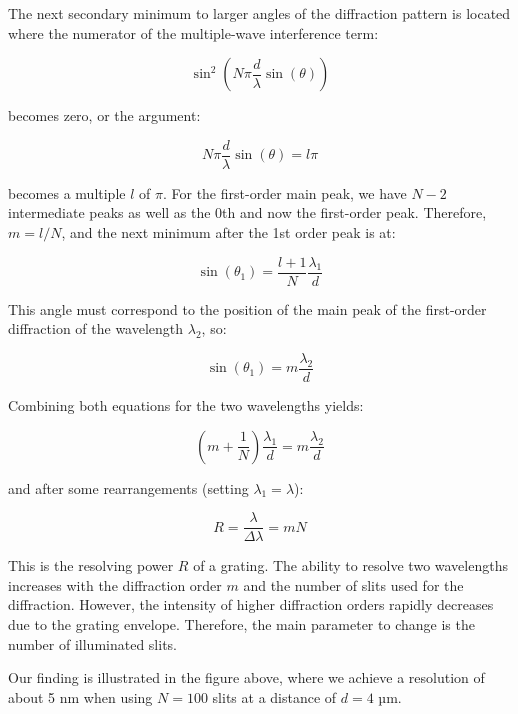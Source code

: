 \documentclass[
  a4paper,
]{book}
\begin{document}
The next secondary minimum to larger angles of the diffraction pattern
is located where the numerator of the multiple-wave interference term:

\[
\sin^2\left(N \pi \frac{d}{\lambda} \sin(\theta)\right)
\]

becomes zero, or the argument:

\[
N \pi \frac{d}{\lambda} \sin(\theta) = l \pi
\]

becomes a multiple \(l\) of \(\pi\). For the first-order main peak, we
have \(N-2\) intermediate peaks as well as the 0th and now the
first-order peak. Therefore, \(m = l/N\), and the next minimum after the
1st order peak is at:

\[
\sin(\theta_1) = \frac{l+1}{N} \frac{\lambda_1}{d}
\]

This angle must correspond to the position of the main peak of the
first-order diffraction of the wavelength \(\lambda_2\), so:

\[
\sin(\theta_1) = m \frac{\lambda_2}{d}
\]

Combining both equations for the two wavelengths yields:

\[
\left(m + \frac{1}{N}\right) \frac{\lambda_1}{d} = m \frac{\lambda_2}{d}
\]

and after some rearrangements (setting \(\lambda_1 = \lambda\)):

\[
R = \frac{\lambda}{\Delta \lambda} = mN
\]

This is the resolving power \(R\) of a grating. The ability to resolve
two wavelengths increases with the diffraction order \(m\) and the
number of slits used for the diffraction. However, the intensity of
higher diffraction orders rapidly decreases due to the grating envelope.
Therefore, the main parameter to change is the number of illuminated
slits.

Our finding is illustrated in the figure above, where we achieve a
resolution of about 5 nm when using \(N=100\) slits at a distance of
\(d=4\) µm.
\end{document}
